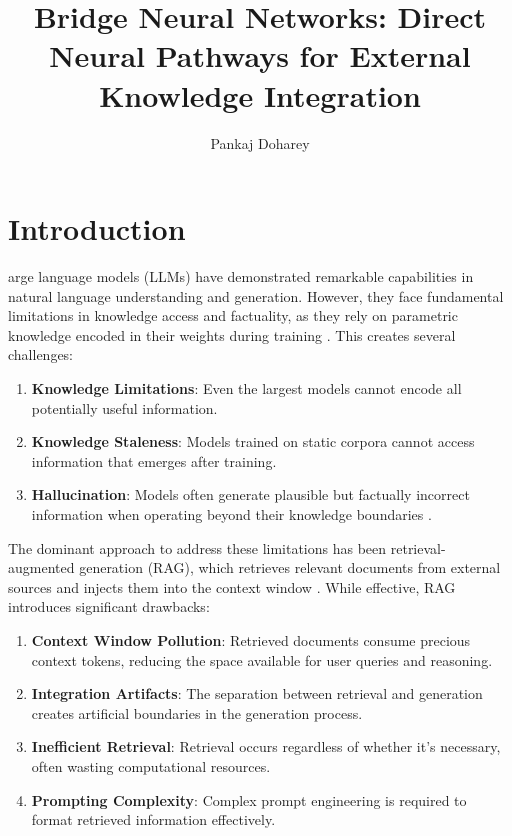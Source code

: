 \documentclass[9pt,a4paper,twocolumn,twoside]{tau-class/tau}
\title{Bridge Neural Networks: Direct Neural Pathways for External Knowledge Integration}
\author[a,1]{Pankaj Doharey}
\affil[a]{zendiffusion.art}
\begin{document}
		
    \maketitle 
    \thispagestyle{firststyle} 
    \tauabstract 
    

\section{Introduction}

    arge language models (LLMs) have demonstrated remarkable capabilities in natural language understanding and generation. However, they face fundamental limitations in knowledge access and factuality, as they rely on parametric knowledge encoded in their weights during training \cite{brown2020language,petroni2019language}. This creates several challenges:

    \begin{enumerate}
        \item \textbf{Knowledge Limitations}: Even the largest models cannot encode all potentially useful information.
        \item \textbf{Knowledge Staleness}: Models trained on static corpora cannot access information that emerges after training.
        \item \textbf{Hallucination}: Models often generate plausible but factually incorrect information when operating beyond their knowledge boundaries \cite{maynez2020faithfulness}.
    \end{enumerate}

    The dominant approach to address these limitations has been retrieval-augmented generation (RAG), which retrieves relevant documents from external sources and injects them into the context window \cite{guu2020realm,lewis2020retrieval}. While effective, RAG introduces significant drawbacks:

    \begin{enumerate}
        \item \textbf{Context Window Pollution}: Retrieved documents consume precious context tokens, reducing the space available for user queries and reasoning.
        \item \textbf{Integration Artifacts}: The separation between retrieval and generation creates artificial boundaries in the generation process.
        \item \textbf{Inefficient Retrieval}: Retrieval occurs regardless of whether it's necessary, often wasting computational resources.
        \item \textbf{Prompting Complexity}: Complex prompt engineering is required to format retrieved information effectively.
    \end{enumerate}
\end{document}
